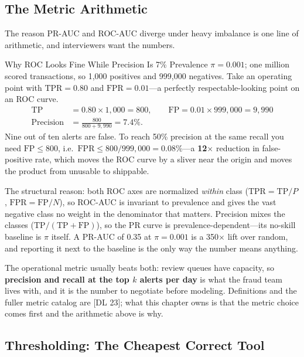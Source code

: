 \subsection{The Metric Arithmetic}

The reason PR-AUC and ROC-AUC diverge under heavy imbalance is one line of arithmetic, and interviewers want the numbers.

\begin{mathresult}{Why ROC Looks Fine While Precision Is 7\%}
Prevalence $\pi = 0.001$; one million scored transactions, so 1{,}000 positives and 999{,}000 negatives. Take an operating point with $\text{TPR} = 0.80$ and $\text{FPR} = 0.01$---a perfectly respectable-looking point on an ROC curve.
\begin{align}
\text{TP} &= 0.80 \times 1{,}000 = 800, \qquad \text{FP} = 0.01 \times 999{,}000 = 9{,}990 \\
\text{Precision} &= \frac{800}{800 + 9{,}990} = 7.4\%.
\end{align}
Nine out of ten alerts are false. To reach 50\% precision at the same recall you need $\text{FP} \le 800$, i.e.\ $\text{FPR} \le 800/999{,}000 = 0.08\%$---a \textbf{12$\times$} reduction in false-positive rate, which moves the ROC curve by a sliver near the origin and moves the product from unusable to shippable.

The structural reason: both ROC axes are normalized \emph{within} class ($\text{TPR} = \text{TP}/P$, $\text{FPR} = \text{FP}/N$), so ROC-AUC is invariant to prevalence and gives the vast negative class no weight in the denominator that matters. Precision mixes the classes ($\text{TP}/(\text{TP}+\text{FP})$), so the PR curve is prevalence-dependent---its no-skill baseline is $\pi$ itself. A PR-AUC of 0.35 at $\pi = 0.001$ is a 350$\times$ lift over random, and reporting it next to the baseline is the only way the number means anything.
\end{mathresult}

The operational metric usually beats both: review queues have capacity, so \textbf{precision and recall at the top $k$ alerts per day} is what the fraud team lives with, and it is the number to negotiate before modeling. Definitions and the fuller metric catalog are [DL 23]; what this chapter owns is that the metric choice comes first and the arithmetic above is why.

\subsection{Thresholding: The Cheapest Correct Tool}

